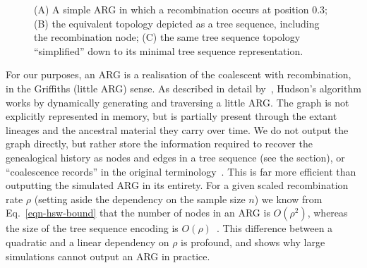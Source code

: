 \documentclass{article}
\begin{document}
\begin{figure}
\begin{subfigure}[t]{0.33\textwidth}
\caption{}\label{fig-arg-c}
\end{subfigure}
\caption{\label{fig-arg} (A) A simple ARG in which a recombination
occurs at position 0.3; (B) the equivalent topology depicted as a tree
sequence, including the recombination node; (C) the same tree sequence
topology ``simplified'' down to its minimal tree sequence representation.}
\end{figure}

For our purposes, an ARG is a realisation of the coalescent with
recombination, in the Griffiths (little ARG) sense.
As described in detail by~\cite{kelleher2016efficient}, Hudson's algorithm
works by dynamically generating and traversing a little ARG.
The graph is not explicitly represented in memory, but is partially
present through the extant lineages and the ancestral material they carry
over time. We do not output the graph directly, but
rather store the information required to recover the genealogical
history as nodes and edges in a tree sequence (see the  section),
or ``coalescence records'' in the original terminology~\citep{kelleher2016efficient}.
This is far more efficient than outputting the simulated ARG in its entirety.
For a given scaled recombination rate $\rho$
(setting aside the dependency on the sample size $n$)
we know from Eq.~\eqref{eqn-hsw-bound} that the number of nodes
in an ARG is $O(\rho^2)$,
whereas the size of the tree sequence encoding is
$O(\rho)$~\citep{kelleher2016efficient}.
This difference between a
quadratic and a linear dependency on $\rho$ is profound, and shows why
large simulations cannot output an ARG in practice.
\end{document}
